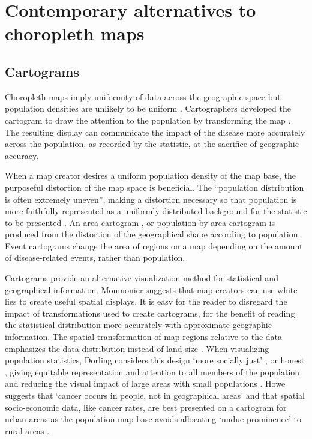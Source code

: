 \documentclass{monashthesis}
\begin{document}
\hypertarget{alternatives}{%
\section{Contemporary alternatives to choropleth maps}\label{alternatives}}

\hypertarget{cartograms}{%
\subsection{Cartograms}\label{cartograms}}

Choropleth maps imply uniformity of data across the geographic space but population densities are unlikely to be uniform \autocite{BCM}. Cartographers developed the cartogram to draw the attention to the population by transforming the map \autocite{ACCAC}. The resulting display can communicate the impact of the disease more accurately across the population, as recorded by the statistic, at the sacrifice of geographic accuracy.

When a map creator desires a uniform population density of the map base, the purposeful distortion of the map space is beneficial. The ``population distribution is often extremely uneven'', making a distortion necessary so that population is more faithfully represented as a uniformly distributed background for the statistic to be presented \autocite{ACTUC} \autocite{CTTMB} \autocite{GOINO}. An area cartogram \autocite{NAC}, or population-by-area cartogram \autocite{TAAM} is produced from the distortion of the geographical shape according to population. Event cartograms \autocite{VSSDCUC} change the area of regions on a map depending on the amount of disease-related events, rather than population.

Cartograms provide an alternative visualization method for statistical and geographical information. Monmonier \autocite{HTLWM} suggests that map creators can use white lies to create useful spatial displays. It is easy for the reader to disregard the impact of transformations used to create cartograms, for the benefit of reading the statistical distribution more accurately with approximate geographic information. The spatial transformation of map regions relative to the data emphasizes the data distribution instead of land size \autocite{CBATCC}. When visualizing population statistics, Dorling considers this design `more socially just' \autocite{ACTUC}, or honest \autocite{NISCC}, giving equitable representation and attention to all members of the population and reducing the visual impact of large areas with small populations \autocite{DMAHP}. Howe \autocite{HEDP} suggests that `cancer occurs in people, not in geographical areas' and that spatial socio-economic data, like cancer rates, are best presented on a cartogram for urban areas as the population map base avoids allocating `undue prominence' to rural areas \autocite{CTTMB}.
\end{document}
